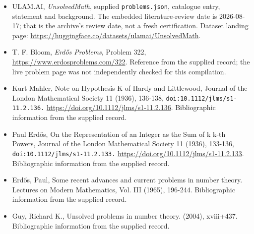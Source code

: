 \documentclass[11pt,a4paper]{article}
\begin{document}
{\small

\begin{itemize}

\item[\hypertarget{source:statement:1}{S1}] ULAM.AI, \emph{UnsolvedMath}, supplied \texttt{problems.json}, catalogue entry, statement and background. The embedded literature-review date is 2026-08-17; that is the archive’s review date, not a fresh certification. Dataset landing page: \url{https://huggingface.co/datasets/ulamai/UnsolvedMath}.

\item[\hypertarget{source:statement:2}{S2}] T. F. Bloom, \emph{Erdős Problems}, Problem 322, \url{https://www.erdosproblems.com/322}. Reference from the supplied record; the live problem page was not independently checked for this compilation.

\item[\hypertarget{source:statement:3}{S3}] Kurt Mahler, Note on Hypothesis K of Hardy and Littlewood, Journal of the London Mathematical Society 11 (1936), 136-138, \nolinkurl{doi:10.1112/jlms/s1-11.2.136.} \url{https://doi.org/10.1112/jlms/s1-11.2.136}. Bibliographic information from the supplied record.

\item[\hypertarget{source:statement:4}{S4}] Paul Erdős, On the Representation of an Integer as the Sum of k k-th Powers, Journal of the London Mathematical Society 11 (1936), 133-136, \nolinkurl{doi:10.1112/jlms/s1-11.2.133.} \url{https://doi.org/10.1112/jlms/s1-11.2.133}. Bibliographic information from the supplied record.

\item[\hypertarget{source:statement:5}{S5}] Erd\H{o}s, Paul, Some recent advances and current problems in number theory. Lectures on Modern Mathematics, Vol. III (1965), 196-244. Bibliographic information from the supplied record.

\item[\hypertarget{source:statement:6}{S6}] Guy, Richard K., Unsolved problems in number theory. (2004), xviii+437. Bibliographic information from the supplied record.

\end{itemize}

}

\label{end:statement}
\end{document}
